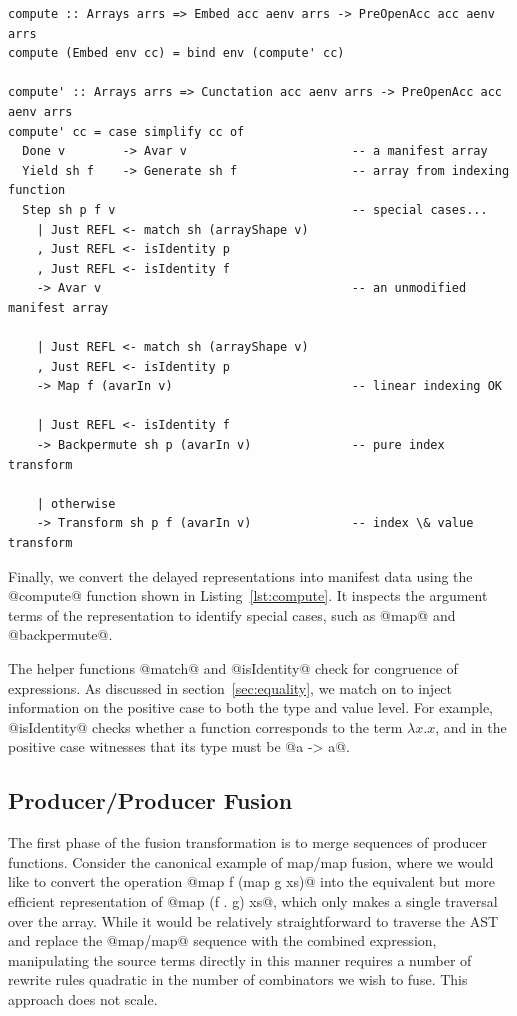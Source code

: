 \begin{lstlisting}[style=haskell_float
    ,label=lst:compute
    ,caption={Computing the delayed representation to a manifest array}]
compute :: Arrays arrs => Embed acc aenv arrs -> PreOpenAcc acc aenv arrs
compute (Embed env cc) = bind env (compute' cc)

compute' :: Arrays arrs => Cunctation acc aenv arrs -> PreOpenAcc acc aenv arrs
compute' cc = case simplify cc of
  Done v        -> Avar v                       -- a manifest array
  Yield sh f    -> Generate sh f                -- array from indexing function
  Step sh p f v                                 -- special cases...
    | Just REFL <- match sh (arrayShape v)
    , Just REFL <- isIdentity p
    , Just REFL <- isIdentity f
    -> Avar v                                   -- an unmodified manifest array

    | Just REFL <- match sh (arrayShape v)
    , Just REFL <- isIdentity p
    -> Map f (avarIn v)                         -- linear indexing OK

    | Just REFL <- isIdentity f
    -> Backpermute sh p (avarIn v)              -- pure index transform

    | otherwise
    -> Transform sh p f (avarIn v)              -- index \& value transform
\end{lstlisting}

Finally, we convert the delayed representations into manifest data using the
@compute@ function shown in Listing~\ref{lst:compute}. It inspects the argument
terms of the representation to identify special cases, such as @map@ and
@backpermute@.

The helper functions @match@ and @isIdentity@ check for congruence of
expressions. As discussed in section~\ref{sec:equality}, we match on  to inject information on the positive case to both the type and value
level. For example, @isIdentity@ checks whether a function corresponds to
the term $\lambda x.x$, and in the positive case witnesses that its type must be
@a -> a@.

\subsection{Producer/Producer Fusion}
\label{sec:producer_producer_fusion}

The first phase of the fusion transformation is to merge sequences of producer
functions. Consider the canonical example of map/map fusion, where we would like
to convert the operation @map f (map g xs)@ into the equivalent but more
efficient representation of @map (f . g) xs@, which only makes a single
traversal over the array. While it would be relatively straightforward to
traverse the AST and replace the @map/map@ sequence with the combined
expression, manipulating the source terms directly in this manner requires a
number of rewrite rules quadratic in the number of combinators we wish to fuse.
This approach does not scale.

